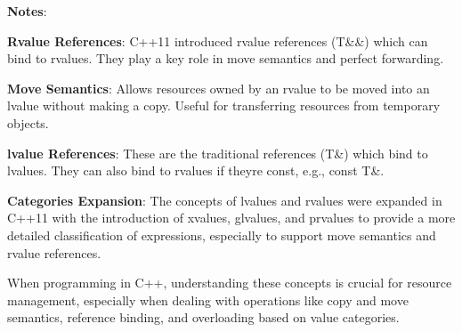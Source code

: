 {\bfseries{Notes}}\+:


\begin{DoxyEnumerate}
\item {\bfseries{Rvalue References}}\+: C++11 introduced rvalue references ({\ttfamily T\&\&}) which can bind to rvalues. They play a key role in move semantics and perfect forwarding.
\item {\bfseries{Move Semantics}}\+: Allows resources owned by an rvalue to be moved into an lvalue without making a copy. Useful for transferring resources from temporary objects.
\item {\bfseries{lvalue References}}\+: These are the traditional references ({\ttfamily T\&}) which bind to lvalues. They can also bind to rvalues if they\textquotesingle{}re {\ttfamily const}, e.\+g., {\ttfamily const T\&}.
\item {\bfseries{Categories Expansion}}\+: The concepts of lvalues and rvalues were expanded in C++11 with the introduction of xvalues, glvalues, and prvalues to provide a more detailed classification of expressions, especially to support move semantics and rvalue references.
\end{DoxyEnumerate}
\begin{DoxyItemize}
\item When programming in C++, understanding these concepts is crucial for resource management, especially when dealing with operations like copy and move semantics, reference binding, and overloading based on value categories. 
\end{DoxyItemize}